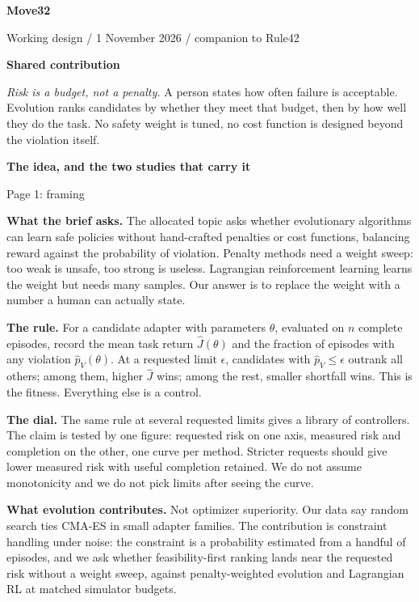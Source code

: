 \documentclass[11pt,a4paper]{article}
\begin{document}
{\LARGE\bfseries Move32}\par
{\small Working design / 1 November 2026 / companion to Rule42}

\textbf{Shared contribution}\par
\emph{Risk is a budget, not a penalty.} A person states how often failure is
acceptable. Evolution ranks candidates by whether they meet that budget, then by
how well they do the task. No safety weight is tuned, no cost function is designed
beyond the violation itself.

\bigskip
{\Large\bfseries The idea, and the two studies that carry it}\par
{\small Page 1: framing}

\textbf{What the brief asks.} The allocated topic asks whether evolutionary
algorithms can learn safe policies without hand-crafted penalties or cost
functions, balancing reward against the probability of violation. Penalty methods
need a weight sweep: too weak is unsafe, too strong is useless. Lagrangian
reinforcement learning learns the weight but needs many samples. Our answer is to
replace the weight with a number a human can actually state.

\textbf{The rule.} For a candidate adapter with parameters $\theta$, evaluated on
$n$ complete episodes, record the mean task return $\widehat J(\theta)$ and the
fraction of episodes with any violation $\widehat p_V(\theta)$. At a requested
limit $\epsilon$, candidates with $\widehat p_V\le\epsilon$ outrank all others;
among them, higher $\widehat J$ wins; among the rest, smaller shortfall wins.
This is the fitness. Everything else is a control.

\textbf{The dial.} The same rule at several requested limits gives a library of
controllers. The claim is tested by one figure: requested risk on one axis,
measured risk and completion on the other, one curve per method. Stricter
requests should give lower measured risk with useful completion retained. We do
not assume monotonicity and we do not pick limits after seeing the curve.

\textbf{What evolution contributes.} Not optimizer superiority. Our data say random
search ties CMA-ES in small adapter families. The contribution is constraint
handling under noise: the constraint is a probability estimated from a handful of
episodes, and we ask whether feasibility-first ranking lands near the requested
risk without a weight sweep, against penalty-weighted evolution and Lagrangian RL
at matched simulator budgets.
\end{document}
